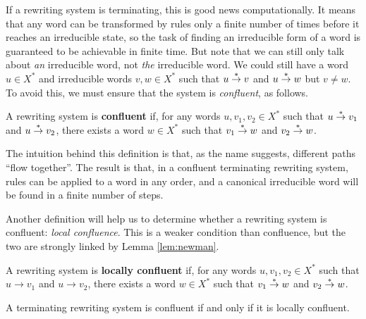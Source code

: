 If a rewriting system is terminating, this is good news computationally.  It
means that any word can be transformed by rules only a finite number of times
before it reaches an irreducible state, so the task of finding an irreducible
form of a word is guaranteed to be achievable in finite time.  But note that we
can still only talk about \textit{an} irreducible word, not \textit{the}
irreducible word.  We could still have a word $u \in X^*$ and irreducible words
$v, w \in X^*$ such that $u \stackrel{*}{\to} v$ and $u \stackrel{*}{\to} w$ but $v \neq w$.
To avoid this, we must ensure that the system is \textit{confluent}, as follows.

\begin{definition}
  \label{def:confluent}
  A rewriting system is \textbf{confluent} if, for any words $u,v_1,v_2 \in X^*$
  such that $u \stackrel{*}{\to} v_1$ and $u \stackrel{*}{\to} v_2$, there exists a word $w \in X^*$
  such that $v_1 \stackrel{*}{\to} w$ and $v_2 \stackrel{*}{\to} w$.
\end{definition}

The intuition behind this definition is that, as the name suggests, different
paths ``flow together''.  The result is that, in a confluent terminating
rewriting system, rules can be applied to a word in any order, and a canonical
irreducible word will be found in a finite number of steps.

Another definition will help us to determine whether a rewriting system is
confluent: \textit{local confluence}.  This is a weaker condition than
confluence, but the two are strongly linked by Lemma \ref{lem:newman}.

\begin{definition}
  \label{def:locally-confluent}
  A rewriting system is \textbf{locally confluent} if, for any words
  $u,v_1,v_2 \in X^*$ such that $u \to v_1$ and $u \to v_2$, there exists a word
  $w \in X^*$ such that $v_1 \stackrel{*}{\to} w$ and $v_2 \stackrel{*}{\to} w$.
\end{definition}

\begin{lemma}
  \label{lem:newman}
  A terminating rewriting system is confluent if and only if it is locally
  confluent.
\end{lemma}

